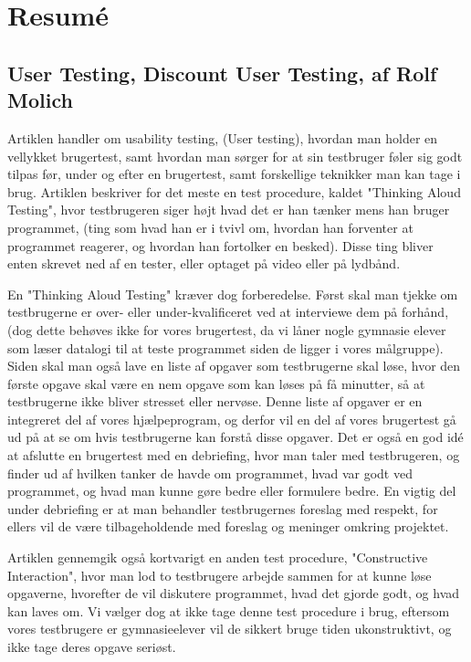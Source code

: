 \documentclass[10pt,a4paper,danish]{article}
\begin{document}
\tableofcontents
\newpage

\section{Resumé}
\subsection{User Testing, Discount User Testing, af Rolf Molich}
Artiklen handler om usability testing, (User testing), hvordan man holder en vellykket brugertest, samt hvordan man sørger for at sin testbruger føler sig godt tilpas før, under og efter en brugertest, samt forskellige teknikker man kan tage i brug. Artiklen beskriver for det meste en test procedure, kaldet "Thinking Aloud Testing", hvor testbrugeren siger højt hvad det er han tænker mens han bruger programmet, (ting som hvad han er i tvivl om, hvordan han forventer at programmet reagerer, og hvordan han fortolker en besked). Disse ting bliver enten skrevet ned af en tester, eller optaget på video eller på lydbånd.

En "Thinking Aloud Testing" kræver dog forberedelse. Først skal man tjekke om testbrugerne er over- eller under-kvalificeret ved at interviewe dem på forhånd, (dog dette behøves ikke for vores brugertest, da vi låner nogle gymnasie elever som læser datalogi til at teste programmet siden de ligger i vores målgruppe). Siden skal man også lave en liste af opgaver som testbrugerne skal løse, hvor den første opgave skal være en nem opgave som kan løses på få minutter, så at testbrugerne ikke bliver stresset eller nervøse. Denne liste af opgaver er en integreret del af vores hjælpeprogram, og derfor vil en del af vores brugertest gå ud på at se om hvis testbrugerne kan forstå disse opgaver. Det er også en god idé at afslutte en brugertest med en debriefing, hvor man taler med testbrugeren, og finder ud af hvilken tanker de havde om programmet, hvad var godt ved programmet, og hvad man kunne gøre bedre eller formulere bedre. En vigtig del under debriefing er at man behandler testbrugernes foreslag med respekt, for ellers vil de være tilbageholdende med foreslag og meninger omkring projektet.

Artiklen gennemgik også kortvarigt en anden test procedure, "Constructive Interaction", hvor man lod to testbrugere arbejde sammen for at kunne løse opgaverne, hvorefter de vil diskutere programmet, hvad det gjorde godt, og hvad kan laves om. Vi vælger dog at ikke tage denne test procedure i brug, eftersom vores testbrugere er gymnasieelever vil de sikkert bruge tiden ukonstruktivt, og ikke tage deres opgave seriøst.
\end{document}
